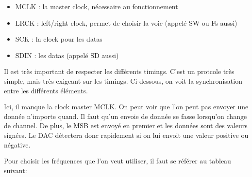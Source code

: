 \documentclass[a4paper]{article}
\begin{document}
\begin{itemize}
  \item MCLK : la master clock, nécessaire au fonctionnement
  \item LRCK : left/right clock, permet de choisir la voie (appelé SW ou Fs aussi)
  \item SCK  : la clock pour les datas
  \item SDIN : les datas (appelé SD aussi)
\end{itemize}

Il est très important de respecter les différents timings. C'est un protcole très simple,
mais très exigeant sur les timings. Ci-dessous, on voit la synchronisation entre les différents
éléments.
\begin{center}
\noindent{}
\end{center}

Ici, il manque la clock master MCLK. On peut voir que l'on peut pas envoyer une donnée
n'importe quand. Il faut qu'un envoie de donnée se fasse lorsqu'on change de channel. De plus,
le MSB est envoyé en premier et les données sont des valeurs signées. Le DAC détectera donc
rapidement si on lui envoit une valeur positive ou négative.

\newpage

Pour choisir les fréquences que l'on veut utiliser, il faut se référer au tableau suivant:
\end{document}
